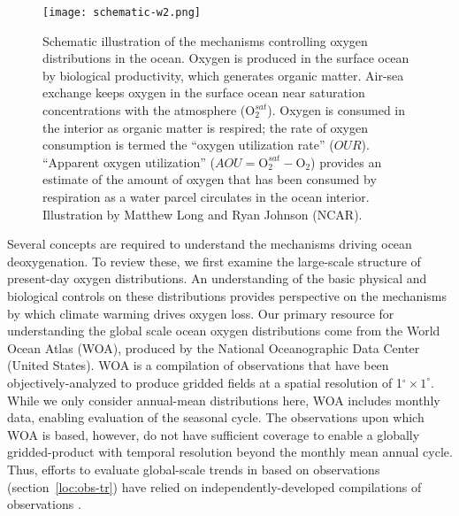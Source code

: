 \documentclass{report_chapter}
\begin{document}
\begin{figure}[p!]
\centering
\texttt{[image: schematic-w2.png]}
\caption{Schematic illustration of the mechanisms controlling oxygen distributions in the ocean.
Oxygen is produced in the surface ocean by biological productivity, which generates organic matter.
Air-sea exchange keeps oxygen in the surface ocean near saturation concentrations with the atmosphere ($\mathrm{O}_2^{sat}$).
Oxygen is consumed in the interior as organic matter is respired; the rate of oxygen consumption is termed the ``oxygen utilization rate'' ($OUR$).
``Apparent oxygen utilization'' (${AOU = \mathrm{O}_2^{sat} - \mathrm{O}_2}$) provides an estimate of the amount of oxygen that has been consumed by respiration as a water parcel circulates in the ocean interior.
Illustration by Matthew Long and Ryan Johnson (NCAR).}
\label{fig:schematic}
\end{figure}

Several concepts are required to understand the mechanisms driving ocean deoxygenation.
To review these, we first examine the large-scale structure of present-day oxygen distributions.
An understanding of the basic physical and biological controls on these distributions provides perspective on the mechanisms by which climate warming drives oxygen loss.
Our primary resource for understanding the global scale ocean oxygen distributions come from the World Ocean Atlas (WOA), produced by the National Oceanographic Data Center (United States).
WOA is a compilation of observations that have been objectively-analyzed to produce gridded fields at a spatial resolution of 1$^\circ\times1^\circ$.
While we only consider annual-mean distributions here, WOA includes monthly data, enabling evaluation of the seasonal cycle.
The observations upon which WOA is based, however, do not have sufficient coverage to enable a globally gridded-product with temporal resolution beyond the monthly mean annual cycle.
Thus, efforts to evaluate global-scale trends in \OO{} based on observations (section~\ref{loc:obs-tr}) have relied on independently-developed compilations of observations \citep[e.g.,][]{Helm-Bindoff-etal-2011,Ito-Minobe-etal-2017,Schmidtko-Stramma-etal-2017}.
\end{document}
